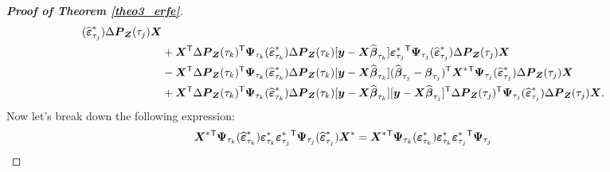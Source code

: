 \documentclass[15pt,a4paper]{article}
\newcommand{\transpose}{{}^{\text{\sffamily T}}}
\begin{document}
\begin{proof}[\textbf{Proof of Theorem \ref{theo3_erfe}}]
\begin{equation*}
\begin{split}
        (\widehat{\boldsymbol{\varepsilon}}^{*}_{\tau_j})\Delta\boldsymbol{P}_{\boldsymbol{Z}}(\tau_j)\boldsymbol{X}\\
& + \boldsymbol{X}\transpose\Delta\boldsymbol{P}_{\boldsymbol{Z}}(\tau_k)\transpose\boldsymbol{\Psi}_{\tau_k}(\widehat{\boldsymbol{\varepsilon}}^{*}_{\tau_k})\Delta\boldsymbol{P}_{\boldsymbol{Z}}(\tau_{k})[\boldsymbol{y}-\boldsymbol{X}
        \widehat{\boldsymbol{\beta}}_{\tau_{k}}]\boldsymbol{\varepsilon}^{*}_{\tau_{j}}\transpose\boldsymbol{\Psi}_{\tau_j}(\widehat{\boldsymbol{\varepsilon}}^{*}_{\tau_j})\Delta\boldsymbol{P}_{\boldsymbol{Z}}(\tau_j)\boldsymbol{X}\\
& - \boldsymbol{X}\transpose\Delta\boldsymbol{P}_{\boldsymbol{Z}}(\tau_k)\transpose\boldsymbol{\Psi}_{\tau_k}(\widehat{\boldsymbol{\varepsilon}}^{*}_{\tau_k})\Delta\boldsymbol{P}_{\boldsymbol{Z}}(\tau_{k})
        [\boldsymbol{y}-\boldsymbol{X}\widehat{\boldsymbol{\beta}}_{\tau_{k}}](\widehat{\boldsymbol{\beta}}_{\tau_{j}} - \boldsymbol{\beta}_{\tau_{j}})\transpose\boldsymbol{X}^{*}\transpose\boldsymbol{\Psi}_{\tau_j}(\widehat{\boldsymbol{\varepsilon}}^{*}_{\tau_j})\Delta\boldsymbol{P}_{\boldsymbol{Z}}(\tau_j)\boldsymbol{X}\\
& + \boldsymbol{X}\transpose\Delta\boldsymbol{P}_{\boldsymbol{Z}}(\tau_k)\transpose\boldsymbol{\Psi}_{\tau_k}(\widehat{\boldsymbol{\varepsilon}}^{*}_{\tau_k})\Delta\boldsymbol{P}_{\boldsymbol{Z}}(\tau_{k})[\boldsymbol{y}-\boldsymbol{X}
        \widehat{\boldsymbol{\beta}}_{\tau_{k}}][\boldsymbol{y}-\boldsymbol{X}\widehat{\boldsymbol{\beta}}_{\tau_{j}}]\transpose\Delta\boldsymbol{P}_{\boldsymbol{Z}}(\tau_{j})\transpose
        \boldsymbol{\Psi}_{\tau_j}(\widehat{\boldsymbol{\varepsilon}}^{*}_{\tau_j})\Delta\boldsymbol{P}_{\boldsymbol{Z}}(\tau_j)\boldsymbol{X}.\\
\end{split}
\end{equation*}
Now let's break down the following expression:
\begin{equation*}
\begin{split}
{}& \boldsymbol{X}^{*}\transpose\boldsymbol{\Psi}_{\tau_k}(\widehat{\boldsymbol{\varepsilon}}^{*}_{\tau_k})\boldsymbol{\varepsilon}^{*}_{\tau_{k}}\boldsymbol{\varepsilon}^{*}_{\tau_{j}}\transpose\boldsymbol{\Psi}_{\tau_j}(\widehat{\boldsymbol{\varepsilon}}^{*}_{\tau_j})
        \boldsymbol{X}^{*} = \boldsymbol{X}^{*}\transpose\boldsymbol{\Psi}_{\tau_k}(\boldsymbol{\varepsilon}^{*}_{\tau_{k}})\boldsymbol{\varepsilon}^{*}_{\tau_{k}}\boldsymbol{\varepsilon}^{*}_{\tau_{j}}\transpose\boldsymbol{\Psi}_{\tau_j}

\end{split}
\end{equation*}
\end{proof}
\end{document}
